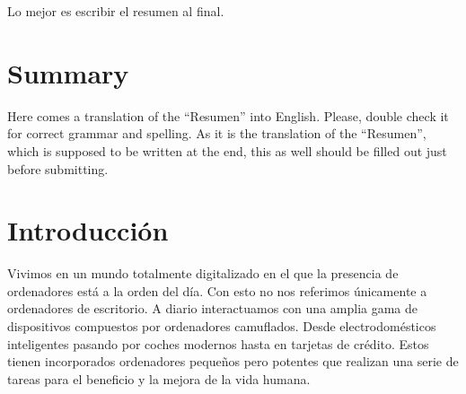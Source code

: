 \documentclass[a4paper, 12pt]{book}
\begin{document}
Lo mejor es escribir el resumen al final.


\chapter*{Summary}

Here comes a translation of the ``Resumen'' into English. 
Please, double check it for correct grammar and spelling.
As it is the translation of the ``Resumen'', which is supposed to be written at the end, this as well should be filled out just before submitting.




\tableofcontents 
\cleardoublepage
\listoffigures %



\cleardoublepage
\chapter{Introducción}
\label{sec:intro} %

Vivimos en un mundo totalmente digitalizado en el que la presencia de ordenadores está a la orden del día. Con esto no nos referimos únicamente a ordenadores de escritorio. A diario interactuamos con una amplia gama de dispositivos compuestos por ordenadores camuflados. Desde electrodomésticos inteligentes pasando por coches modernos hasta en tarjetas de crédito. Estos tienen incorporados ordenadores pequeños pero potentes que realizan una serie de tareas para el beneficio y la mejora de la vida humana.
\end{document}
